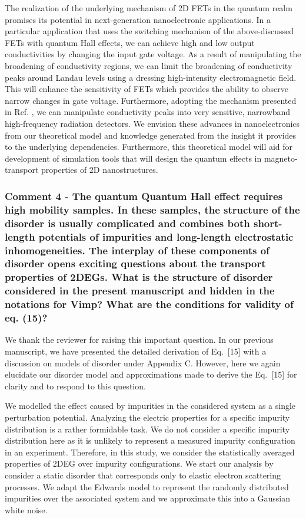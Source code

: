 \documentclass{article}
\begin{document}
\begin{itemize}
{  The realization of the underlying mechanism of 2D FETs in the quantum realm promises its potential in next-generation nanoelectronic applications. In a particular application that uses the switching mechanism of the above-discussed FETs with quantum Hall effects, we can achieve high and low output conductivities by changing the input gate voltage. As a result of manipulating the broadening of conductivity regions, we can limit the broadening of conductivity peaks around Landau levels using a dressing high-intensity electromagnetic field. This will enhance the sensitivity of FETs which provides the ability to observe narrow changes in gate voltage.
  Furthermore, adopting the mechanism presented in Ref. \cite{hirakawa01}, we can manipulate conductivity peaks into very sensitive, narrowband high-frequency radiation detectors.
  We envision these advances in nanoelectronics from our theoretical model and knowledge generated from the insight it provides to the underlying dependencies.
  Furthermore, this theoretical model will aid for development of simulation tools that will design the quantum effects in
magneto-transport properties of 2D nanostructures.
  }
\end{itemize}

\subsubsection*{Comment 4 -
\color{RoyalBlue} The quantum Quantum Hall effect requires high mobility samples. In these samples, the structure of the disorder is usually complicated and combines both short-length potentials of impurities and long-length electrostatic inhomogeneities. The interplay of these components of disorder opens exciting questions about the transport properties of 2DEGs. What is the structure of disorder considered in the present manuscript and hidden in the notations for Vimp? What are the conditions for validity of eq. (15)?
}

We thank the reviewer for raising this important question. In our previous manuscript, we have presented the detailed derivation of Eq.~[15] with a discussion on models of disorder under Appendix C. However, here we again elucidate our disorder model and approximations made to derive the Eq.~[15] for clarity and to respond to this question.

We modelled the effect caused by impurities in the considered system as a single perturbation potential. Analyzing the electric properties for a specific impurity distribution is a rather formidable task. We do not consider a specific impurity distribution here as it is unlikely to represent a measured impurity configuration in an experiment. Therefore, in this study, we consider the statistically averaged properties of 2DEG over impurity configurations.
We start our analysis by consider a static disorder that corresponds only to elastic electron scattering processes.
We adapt the Edwards model \cite{akkermans10} to represent the randomly distributed impurities over the associated system and we approximate this into a Gaussian white noise.
\end{document}

